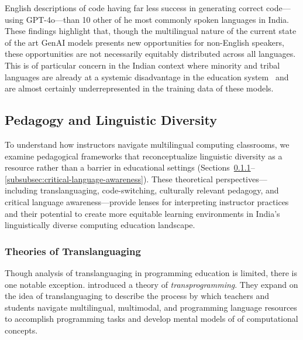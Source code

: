 English descriptions of code having far less success in generating correct
code---using GPT-4o---than 10 other of he most commonly spoken languages in
India. These findings highlight that, though the multilingual nature of the
current state of the art GenAI models presents new opportunities for non-English
speakers, these opportunities are not necessarily equitably distributed across
all languages. This is of particular concern in the Indian context where
minority and tribal languages are already at a systemic disadvantage in the
education system~\cite{mohanty2017language} and are almost certainly
underrepresented in the training data of these models.



\subsection{Pedagogy and Linguistic Diversity}\label{subsec:pedagogy-and-linguistic-diversity}

To understand how instructors navigate multilingual computing classrooms,
we examine pedagogical frameworks that reconceptualize linguistic diversity
as a resource rather than a barrier in educational settings
(Sections~\ref{subsubsec:theories-of-translanguaging}--\ref{subsubsec:critical-language-awareness}). These theoretical perspectives—including
translanguaging, code-switching, culturally relevant pedagogy, and critical
language awareness—provide lenses for interpreting instructor practices and
their potential to create more equitable learning environments in India's
linguistically diverse computing education landscape.

\subsubsection{Theories of Translanguaging}\label{subsubsec:theories-of-translanguaging}

\textcolor{red}{
  \blindtext[1]
}

Though analysis of translanguaging in programming education is limited, there is
one notable exception. \citet{tai2024transprogramming} introduced a theory of
\textit{transprogramming}. They expand on the idea of translanguaging to
describe the process by which teachers and students navigate multilingual,
multimodal, and programming language resources to accomplish programming tasks
and develop mental models of of computational concepts.

